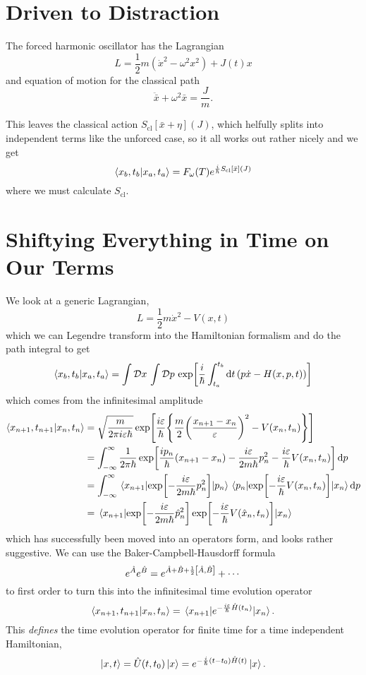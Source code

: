 \documentclass[]{revision-notes}
\begin{document}
\section{Driven to Distraction}
The forced harmonic oscillator has the Lagrangian
\[ L = \frac{1}{2} m (\dot{x}^2 - \omega^2 x^2) + J(t)x \]
and equation of motion for the classical path
\[ \ddot{\bar{x}} + \omega^2 \bar{x} = \frac{J}{m}. \]

This leaves the classical action \(S_\mathrm{cl}[\bar{x} + \eta](J) \), which helfully splits into independent terms like the unforced case, so it all works out rather nicely and we get
\begin{equation*}
  \braket{x_b, t_b}{x_a, t_a} = F_\omega(T)e^{\frac{i}{\hbar} S_\mathrm{cl}[\bar{x}](J)}
\end{equation*}
where we must calculate \(S_\mathrm{cl}\).

\section{Shiftying Everything in Time on Our Terms}
We look at a generic Lagrangian, \[ L= \frac{1}{2} m \dot{x}^2 - V(x, t) \] which we can Legendre transform into the Hamiltonian formalism and do the path integral to get
\[ \braket{x_b, t_b}{x_a, t_a} = \int \mathcal{D} x\, \int \mathcal{D} p\, \exp[\frac{i}{\hbar} \int_{t_a}^{t_b} \dd{t} (p\dot{x} - H(x, p, t))] \]
which comes from the infinitesimal amplitude
\begin{align*}
  \braket{x_{n+1}, t_{n+1}}{x_n, t_n} &= \sqrt{\frac{m}{2\pi i \varepsilon\hbar}} \exp[\frac{i\varepsilon}{\hbar}\qty{\frac{m}{2}\qty(\frac{x_{n+1} - x_n}{\varepsilon})^2 - V(x_n, t_n)}] \\
  &= \int_{-\infty}^\infty \frac{1}{2\pi\hbar}\exp[\frac{ip_n}{\hbar}(x_{n+1} - x_n) - \frac{i\varepsilon}{2m\hbar}p_n^2 - \frac{i\varepsilon}{\hbar}V(x_n, t_n)]\dd{p}\\
  &= \int_{-\infty}^\infty \mel{x_{n+1}}{\exp[-\frac{i\varepsilon}{2m\hbar}p_n^2]}{p_n} \mel{p_n}{\exp[ -\frac{i\varepsilon}{\hbar}V(x_n, t_n)]}{x_{n}}\dd{p}\\
  &=\mel{x_{n+1}}{\exp[-\frac{i\varepsilon}{2m\hbar}\hat{p}_n^2]\exp[ -\frac{i\varepsilon}{\hbar}V(\hat{x}_n, t_n)]}{x_{n}}
\end{align*}
which has successfully been moved into an operators form, and looks rather suggestive.
We can use the Baker-Campbell-Hausdorff formula \[ e^{\hat{A}}e^{\hat{B}} = e^{\hat{A} + \hat{B} + \frac{1}{2}\commutator{\hat{A}}{\hat{B}}} + \cdots \]
to first order to turn this into the infinitesimal time evolution operator \[\braket{x_{n+1}, t_{n+1}}{x_{n}, t_{n}} = \mel{x_{n+1}}{e^{-\frac{i\varepsilon}{\hbar{}} \hat{H}(t_n)}}{x_{n}}.\]
This \emph{defines} the time evolution operator for finite time for a time independent Hamiltonian,
\[ \ket{x, t} = \hat{U}(t, t_0)\ket{x} = e^{-\frac{i}{\hbar{}} (t - t_0) \hat{H}(t)}\ket{x}.\]
\end{document}
